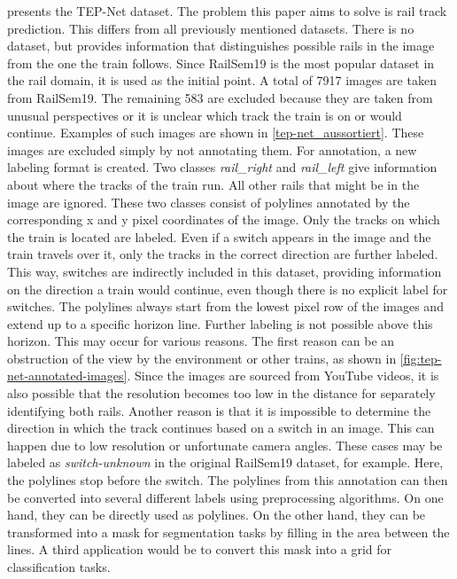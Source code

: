 \cite{tepNet2024} presents the \ac{TEP}-Net dataset.
The problem this paper aims to solve is rail track prediction.
This differs from all previously mentioned datasets.
There is no dataset, but \cite{tepNet2024} provides information that distinguishes possible rails in the image from the one the train follows.
Since RailSem19 is the most popular dataset in the rail domain, it is used as the initial point.
A total of 7917 images are taken from RailSem19.
The remaining 583 are excluded because they are taken from unusual perspectives or it is unclear which track the train is on or would continue.
Examples of such images are shown in \autoref{tep-net_aussortiert}.
These images are excluded simply by not annotating them.
For annotation, a new labeling format is created.
Two classes \textit{rail\_right} and \textit{rail\_left} give information about where the tracks of the train run.
All other rails that might be in the image are ignored.
These two classes consist of polylines annotated by the corresponding x and y pixel coordinates of the image.
Only the tracks on which the train is located are labeled.
Even if a switch appears in the image and the train travels over it, only the tracks in the correct direction are further labeled.
This way, switches are indirectly included in this dataset, providing information on the direction a train would continue, even though there is no explicit label for switches.
The polylines always start from the lowest pixel row of the images and extend up to a specific horizon line.
Further labeling is not possible above this horizon.
This may occur for various reasons.
The first reason can be an obstruction of the view by the environment or other trains, as shown in \autoref{fig:tep-net-annotated-images}.
Since the images are sourced from YouTube videos, it is also possible that the resolution becomes too low in the distance for separately identifying both rails.
Another reason is that it is impossible to determine the direction in which the track continues based on a switch in an image.
This can happen due to low resolution or unfortunate camera angles.
These cases may be labeled as \textit{switch-unknown} in the original RailSem19 dataset, for example.
Here, the polylines stop before the switch.
The polylines from this annotation can then be converted into several different labels using preprocessing algorithms.
On one hand, they can be directly used as polylines.
On the other hand, they can be transformed into a mask for segmentation tasks by filling in the area between the lines.
A third application would be to convert this mask into a grid for classification tasks.

